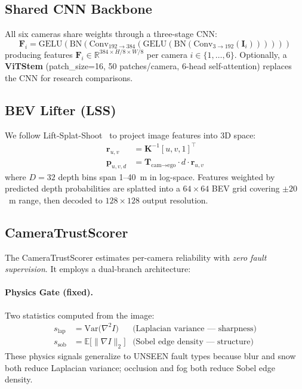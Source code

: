 \documentclass[10pt,twocolumn]{article}
\begin{document}
\subsection{Shared CNN Backbone}

All six cameras share weights through a three-stage CNN:
\begin{equation}
  \mathbf{F}_i = \text{GELU}(\text{BN}(\text{Conv}_{192\to384}(
    \text{GELU}(\text{BN}(\text{Conv}_{3\to192}(\mathbf{I}_i))))))
\end{equation}
producing features $\mathbf{F}_i \in \mathbb{R}^{384 \times H/8 \times W/8}$
per camera $i \in \{1,\ldots,6\}$.
Optionally, a \textbf{ViTStem} (patch\_size=16, 50 patches/camera,
6-head self-attention) replaces the CNN for research comparisons.

\subsection{BEV Lifter (LSS)}

We follow Lift-Splat-Shoot~\cite{philion2020lss} to project image
features into 3D space:
\begin{align}
  \mathbf{r}_{u,v} &= \mathbf{K}^{-1} [u, v, 1]^\top \\
  \mathbf{p}_{u,v,d} &= \mathbf{T}_{\text{cam}\to\text{ego}} \cdot d \cdot \mathbf{r}_{u,v}
\end{align}
where $D=32$ depth bins span 1--40~m in log-space. Features weighted
by predicted depth probabilities are splatted into a
$64\!\times\!64$ BEV grid covering $\pm20$~m range, then decoded to
$128\!\times\!128$ output resolution.

\subsection{CameraTrustScorer}
\label{sec:trust}

The CameraTrustScorer estimates per-camera reliability with
\textit{zero fault supervision}. It employs a dual-branch architecture:

\paragraph{Physics Gate (fixed).}
Two statistics computed from the image:
\begin{align}
  s_{\text{lap}} &= \text{Var}\bigl(\nabla^2 I\bigr)
    & \text{(Laplacian variance --- sharpness)} \\
  s_{\text{sob}} &= \mathbb{E}\bigl[\|\nabla I\|_2\bigr]
    & \text{(Sobel edge density --- structure)}
\end{align}
These physics signals generalize to UNSEEN fault types because blur and
snow both reduce Laplacian variance; occlusion and fog both reduce
Sobel edge density.
\end{document}

